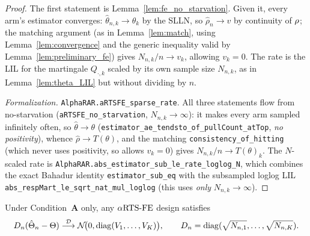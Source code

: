\begin{proof}
The first statement is Lemma~\ref{lem:fe_no_starvation}. Given it, every arm's
estimator converges: $\hat{\theta}_{n,k}\to\theta_k$ by the SLLN, so
$\hat{\rho}_n\to v$ by continuity of $\rho$; the matching argument (as in
Lemma~\ref{lem:match}, using Lemma~\ref{lem:convergence} and the generic
inequality valid by Lemma~\ref{lem:preliminary_fe}) gives $N_{n,k}/n\to v_k$,
allowing $v_k=0$. The rate is the LIL for the martingale $Q_{\cdot,k}$ scaled by
its own sample size $N_{n,k}$, as in Lemma~\ref{lem:theta_LIL} but without
dividing by $n$.

\emph{Formalization.} \texttt{AlphaRAR.aRTSFE\_sparse\_rate}. All three statements flow from
no-starvation (\texttt{aRTSFE\_no\_starvation}, $N_{n,k}\to\infty$): it makes every arm sampled
infinitely often, so $\hat\theta\to\theta$ (\texttt{estimator\_ae\_tendsto\_of\_pullCount\_atTop},
\emph{no positivity}), whence $\hat\rho\to T(\theta)$, and the matching
\texttt{consistency\_of\_hitting} (which never uses positivity, so allows $v_k=0$) gives
$N_{n,k}/n\to T(\theta)_k$. The $N$-scaled rate is \texttt{AlphaRAR.abs\_estimator\_sub\_le\_rate\_loglog\_N},
which combines the exact Bahadur identity \texttt{estimator\_sub\_eq} with the subsampled loglog LIL
\texttt{abs\_respMart\_le\_sqrt\_nat\_mul\_loglog} (this uses \emph{only} $N_{n,k}\to\infty$).
\end{proof}

\begin{corollary}\label{cor:sparse_clt}
Under Condition~\textbf{A} only, any $\alpha\text{RTS-FE}$ design satisfies
\[
  D_n(\hat{\Theta}_n-\Theta)\overset{\mathcal{D}}{\longrightarrow}\mathcal{N}\!\big(0,\mathrm{diag}(V_1,\dots,V_K)\big),
  \qquad D_n=\mathrm{diag}(\sqrt{N_{n,1}},\dots,\sqrt{N_{n,K}}).
\]
\end{corollary}

\leanok

